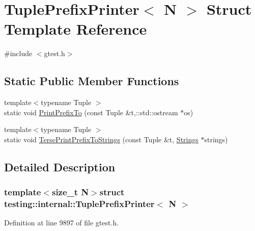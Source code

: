\hypertarget{structtesting_1_1internal_1_1TuplePrefixPrinter}{\section{\-Tuple\-Prefix\-Printer$<$ \-N $>$ \-Struct \-Template \-Reference}
\label{d2/dd0/structtesting_1_1internal_1_1TuplePrefixPrinter}
}


{\ttfamily \#include $<$gtest.\-h$>$}

\subsection*{\-Static \-Public \-Member \-Functions}
\begin{DoxyCompactItemize}
\item 
{\footnotesize template$<$typename Tuple $>$ }\\static void \hyperlink{structtesting_1_1internal_1_1TuplePrefixPrinter_a471ff2966d5382e964d52f9ad0381c0b}{\-Print\-Prefix\-To} (const \-Tuple \&t,\-::std\-::ostream $\ast$os)
\item 
{\footnotesize template$<$typename Tuple $>$ }\\static void \hyperlink{structtesting_1_1internal_1_1TuplePrefixPrinter_a74cfd757d88ad213bcb8270b0e91a305}{\-Terse\-Print\-Prefix\-To\-Strings} (const \-Tuple \&t, \hyperlink{namespacetesting_1_1internal_a6d618e88721d4c38cbecabe0d2e8341c}{\-Strings} $\ast$strings)
\end{DoxyCompactItemize}


\subsection{\-Detailed \-Description}
\subsubsection*{template$<$size\-\_\-t \-N$>$struct testing\-::internal\-::\-Tuple\-Prefix\-Printer$<$ N $>$}



\-Definition at line 9897 of file gtest.\-h.



